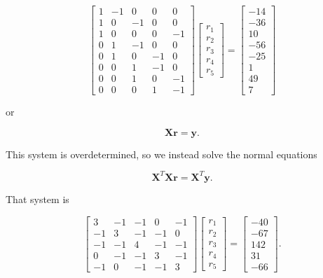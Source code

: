 \documentclass[
]{book}
\theoremstyle{definition}
\theoremstyle{definition}
\theoremstyle{definition}
\theoremstyle{definition}
\theoremstyle{remark}
\begin{document}
\[\left[\begin{array}{rrrrr}1 & -1 & 0 & 0 & 0\\1 & 0 & -1 & 0 & 0\\1 & 0 & 0 & 0 & -1\\0 & 1 & -1 & 0 & 0\\0 & 1 & 0 & -1 & 0\\0 & 0 & 1 & -1 & 0 \\0 & 0 & 1 & 0 & -1\\0 & 0 & 0 & 1 & -1\end{array}\right]\begin{bmatrix}r_1\\r_2\\r_3\\r_4\\r_5\end{bmatrix}=\left[\begin{array}{r}-14 \\-36\\10\\-56\\-25\\1\\49\\7\end{array}\right]\]

or

\[\mathbf{X}\mathbf{r}=\mathbf{y}.\]

This system is overdetermined, so we instead solve the normal equations

\[\mathbf{X}^T\mathbf{X}\mathbf{r}=\mathbf{X}^T\mathbf{y}.\]

That system is

\[\left[\begin{array}{rrrrr}3 & -1 & -1 & 0 & -1\\-1 & 3 & -1 & -1 & 0\\-1 & -1 & 4 & -1 & -1\\0 & -1 & -1 & 3 & -1\\-1 & 0 & -1 & -1 & 3\end{array}\right]\begin{bmatrix}r_1\\r_2\\r_3\\r_4\\r_5\end{bmatrix}=\left[\begin{array}{r}-40\\-67\\142\\31\\-66\end{array}\right].\]
\end{document}
